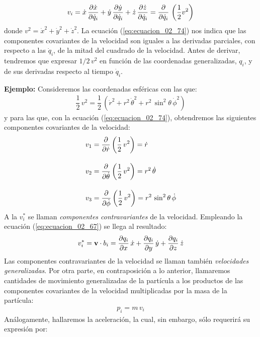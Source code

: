 \documentclass[12pt]{article}
\begin{document}
\begin{align}
    v_{i} = \dot{x} \, \pdv{\dot{x}}{\dot{q}_{i}} + \dot{y} \, \pdv{\dot{y}}{\dot{q}_{i}} + \dot{z} \, \pdv{\dot{z}}{\dot{q}_{i}} = \pdv{\dot{q}_{i}} \, \left( \dfrac{1}{2} v^{2} \right)
    \label{eq:ecuacion_02_74}
\end{align}
donde $v^{2} = \dot{x}^{2} + \dot{y}^{2} + \dot{z}^{2}$. La ecuación (\ref{eq:ecuacion_02_74}) nos indica que las componentes covariantes de la velocidad son iguales a las derivadas parciales, con respecto a las $\dot{q}_{i}$, de la mitad del cuadrado de la velocidad. Antes de derivar, tendremos que expresar $1/2 \, v^{2}$ en función de las coordenadas generalizadas, $q_{i}$, y de sus derivadas respecto al tiempo $\dot{q}_{i}$. 
\par
\noindent
\textbf{Ejemplo: } Consideremos las coordenadas esféricas con las que:
\begin{align*}
    \dfrac{1}{2} \, v^{2} = \dfrac{1}{2} \, \left( \dot{r}^{2} + r^{2} \, \dot{\theta}^{2} + r^{2} \, \sin^{2} \theta \, \dot{\phi}^{2} \right)
\end{align*}
y para las que, con la ecuación (\ref{eq:ecuacion_02_74}), obtendremos las siguientes componentes covariantes de la velocidad:
\begin{align*}
    v_{1} &= \pdv{\dot{r}} \left( \dfrac{1}{2} \, v^{2} \right) = \dot{r} \\[1em]
    v_{2} &= \pdv{\dot{\theta}} \left( \dfrac{1}{2} \, v^{2} \right) = r^{2} \, \dot{\theta} \\[1em]
    v_{3} &= \pdv{\dot{\phi}} \left( \dfrac{1}{2} \, v^{2} \right) = r^{2} \, \sin^{2} \theta \, \dot{\phi}
\end{align*}
A la $v_{i}^{*}$ se llaman \emph{componentes contravariantes} de la velocidad. Empleando la ecuación (\ref{eq:ecuacion_02_67}) se llega al resultado:
\begin{align}
    v_{i}^{*} = \vb{v} \cdot b_{i} = \pdv{q_{i}}{x} \, \dot{x} + \pdv{q_{i}}{y} \, \dot{y} + \pdv{q_{i}}{z} \, \dot{z}
    \label{eq:ecuacion_02_75}
\end{align} 
Las componentes contravariantes de la velocidad se llaman también \emph{velocidades generalizadas}. Por otra parte, en contraposición a lo anterior, llamaremos cantidades de movimiento generalizadas de la partícula a los productos de las componentes covariantes de la velocidad multiplicadas por la masa de la partícula:
\begin{align*}
    p_{i} = m \, v_{i}
\end{align*} 
Análogamente, hallaremos la aceleración, la cual, sin embargo, sólo requerirá su expresión por:
\end{document}
